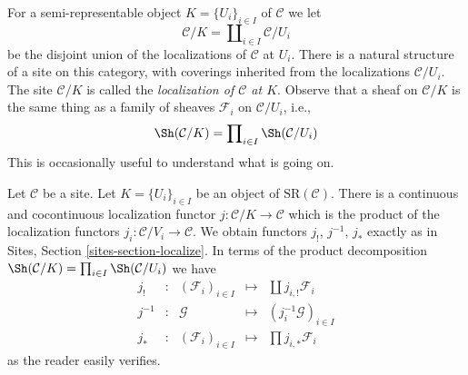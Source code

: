 \medskip\noindent
For a semi-representable object $K = \{U_i\}_{i \in I}$ of $\mathcal{C}$
we let
$$
\mathcal{C}/K = \coprod\nolimits_{i \in I} \mathcal{C}/U_i
$$
be the disjoint union of the localizations of $\mathcal{C}$ at $U_i$.
There is a natural structure of a site on this category, with
coverings inherited from the localizations $\mathcal{C}/U_i$.
The site $\mathcal{C}/K$ is called the
{\it localization of $\mathcal{C}$ at $K$}.
Observe that a sheaf on $\mathcal{C}/K$ is the same thing as
a family of sheaves $\mathcal{F}_i$ on $\mathcal{C}/U_i$, i.e.,
$$
\Sh(\mathcal{C}/K) = \prod\nolimits_{i \in I} \Sh(\mathcal{C}/U_i)
$$
This is occasionally useful to understand what is going on.

\medskip\noindent
Let $\mathcal{C}$ be a site. Let $K = \{U_i\}_{i \in I}$ be an object of
$\text{SR}(\mathcal{C})$. There is a continuous and cocontinuous
localization functor $j : \mathcal{C}/K \to \mathcal{C}$ which is
the product of the localization functors
$j_i : \mathcal{C}/V_i \to \mathcal{C}$.
We obtain functors $j_!$, $j^{-1}$, $j_*$ exactly
as in Sites, Section \ref{sites-section-localize}.
In terms of the product decomposition
$\Sh(\mathcal{C}/K) = \prod\nolimits_{i \in I} \Sh(\mathcal{C}/U_i)$
we have
$$
\begin{matrix}
j_! & : &
(\mathcal{F}_i)_{i \in I} &
\longmapsto &
\coprod j_{i, !}\mathcal{F}_i \\
j^{-1} & : &
\mathcal{G} &
\longmapsto &
(j_i^{-1}\mathcal{G})_{i \in I} \\
j_* & : &
(\mathcal{F}_i)_{i \in I} &
\longmapsto &
\prod j_{i, *}\mathcal{F}_i
\end{matrix}
$$
as the reader easily verifies.

